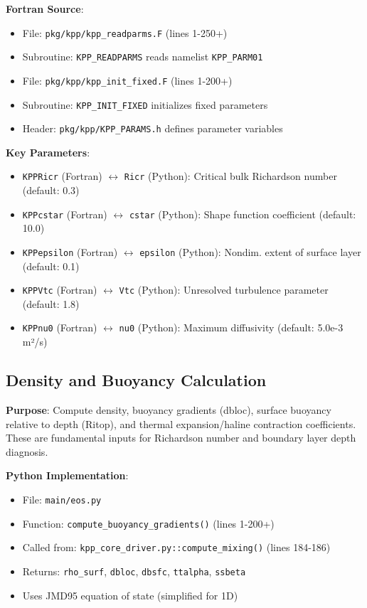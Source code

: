\documentclass[11pt]{article}
\begin{document}
\textbf{Fortran Source}:
\begin{itemize}
    \item File: \verb|pkg/kpp/kpp_readparms.F| (lines 1-250+)
    \item Subroutine: \verb|KPP_READPARMS| reads namelist \verb|KPP_PARM01|
    \item File: \verb|pkg/kpp/kpp_init_fixed.F| (lines 1-200+)
    \item Subroutine: \verb|KPP_INIT_FIXED| initializes fixed parameters
    \item Header: \verb|pkg/kpp/KPP_PARAMS.h| defines parameter variables
\end{itemize}

\textbf{Key Parameters}:
\begin{itemize}
    \item \verb|KPPRicr| (Fortran) $\leftrightarrow$ \verb|Ricr| (Python): Critical bulk Richardson number (default: 0.3)
    \item \verb|KPPcstar| (Fortran) $\leftrightarrow$ \verb|cstar| (Python): Shape function coefficient (default: 10.0)
    \item \verb|KPPepsilon| (Fortran) $\leftrightarrow$ \verb|epsilon| (Python): Nondim. extent of surface layer (default: 0.1)
    \item \verb|KPPVtc| (Fortran) $\leftrightarrow$ \verb|Vtc| (Python): Unresolved turbulence parameter (default: 1.8)
    \item \verb|KPPnu0| (Fortran) $\leftrightarrow$ \verb|nu0| (Python): Maximum diffusivity (default: 5.0e-3 m²/s)
\end{itemize}

\subsection{Density and Buoyancy Calculation}

\textbf{Purpose}: Compute density, buoyancy gradients (dbloc), surface buoyancy relative to depth (Ritop), and thermal expansion/haline contraction coefficients. These are fundamental inputs for Richardson number and boundary layer depth diagnosis.

\textbf{Python Implementation}:
\begin{itemize}
    \item File: \verb|main/eos.py|
    \item Function: \verb|compute_buoyancy_gradients()| (lines 1-200+)
    \item Called from: \verb|kpp_core_driver.py::compute_mixing()| (lines 184-186)
    \item Returns: \verb|rho_surf|, \verb|dbloc|, \verb|dbsfc|, \verb|ttalpha|, \verb|ssbeta|
    \item Uses JMD95 equation of state (simplified for 1D)
\end{itemize}
\end{document}
